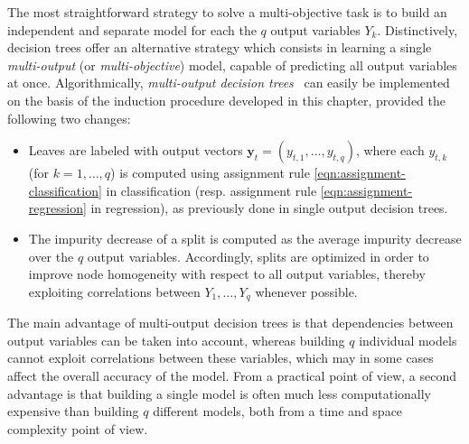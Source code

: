 The most straightforward strategy to solve a multi-objective task is to build
an independent and separate model for each the $q$ output variables $Y_k$.
Distinctively, decision trees offer an alternative strategy which consists in
learning a single \textit{multi-output} (or \textit{multi-objective}) model,
capable of predicting all output variables at once. Algorithmically,  \textit
{multi-output decision trees}~\citep{dumont:2007,kocev:2007} can easily be
implemented on the basis of the induction procedure developed in this chapter,
provided the following two changes:
\begin{itemize}
\item Leaves are labeled with output vectors $\mathbf{y}_t = (y_{t,1}, \dots, y_{t,q})$,
      where each $y_{t,k}$ (for $k=1,\dots,q$) is computed using assignment rule
      \ref{eqn:assignment-classification} in classification (resp. assignment
      rule \ref{eqn:assignment-regression} in regression), as previously
      done in single output decision trees.

\item The impurity decrease of a split is computed as the average impurity decrease
      over the $q$ output variables. Accordingly, splits are optimized
      in order to improve node homogeneity with respect to all output variables,
      thereby exploiting correlations between $Y_1, \dots, Y_q$ whenever possible.

\end{itemize}

The main advantage of multi-output decision trees is that dependencies between
output variables can be taken into account, whereas building $q$ individual
models cannot exploit correlations between these variables, which may in some
cases affect the overall accuracy of the model. From a practical point of view,
a second advantage is that building a single model is often much less
computationally expensive than building $q$ different models, both from a time
and space complexity point of view.
